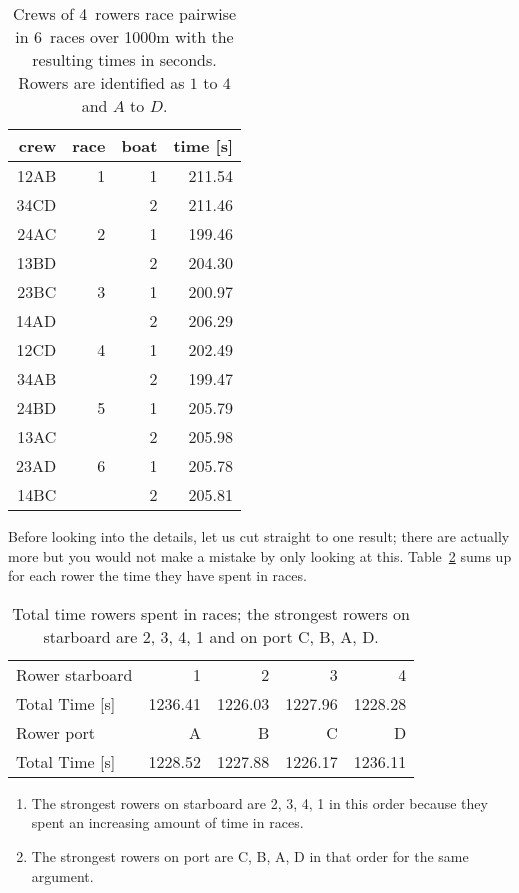 \documentclass[a4paper,11pt]{article}
\begin{document}
\begin{table}[ht]
\centering
\begin{tabular}{rrrr}
  \toprule
 crew & race & boat & time [s] \\ 
  \midrule
 12AB &   1 & 1 & 211.54 \\ 
 34CD &     & 2 & 211.46 \\ [.8ex]
 24AC &   2 & 1 & 199.46 \\ 
 13BD &     & 2 & 204.30 \\ [.8ex]
 23BC &   3 & 1 & 200.97 \\ 
 14AD &     & 2 & 206.29 \\ [.8ex]
 12CD &   4 & 1 & 202.49 \\ 
 34AB &     & 2 & 199.47 \\ [.8ex]
 24BD &   5 & 1 & 205.79 \\ 
 13AC &     & 2 & 205.98 \\ [.8ex]
 23AD &   6 & 1 & 205.78 \\ 
 14BC &     & 2 & 205.81 \\ 
   \bottomrule
\end{tabular}
  \caption{\label{tab:races} Crews of 4~rowers race pairwise in 6~races
  over 1000m with the resulting times in seconds. Rowers are identified
  as $1$ to $4$ and $A$ to $D$.}
\end{table}

\iffalse
Before looking into the details, let us cut straight to one result; there
are actually more but you would not make a mistake by only looking at
this. Table~\ref{tab:basic} sums up for each rower the time they have
spent in races.

\begin{table}[ht]
\centering
\begin{tabular}{l rrrr}
  \toprule
Rower starboard & 1 & 2 & 3 & 4 \\
Total Time [s]  & 1236.41 & 1226.03 & 1227.96 & 1228.28 \\
  \midrule
Rower port      & A & B & C & D \\ 
Total Time [s]  & 1228.52 & 1227.88 & 1226.17 & 1236.11 \\ 
  \bottomrule
\end{tabular}
  \caption{\label{tab:basic} Total time rowers spent in races; the
  strongest rowers on starboard are 2, 3, 4, 1 and on port C, B, A, D.}
\end{table}

\begin{enumerate}
\item The strongest rowers on starboard are 2, 3, 4, 1 in this order
because they spent an increasing amount of time in races.
\item The strongest rowers on port are C, B, A, D in that order for the
same argument.
\end{enumerate}
\end{document}
